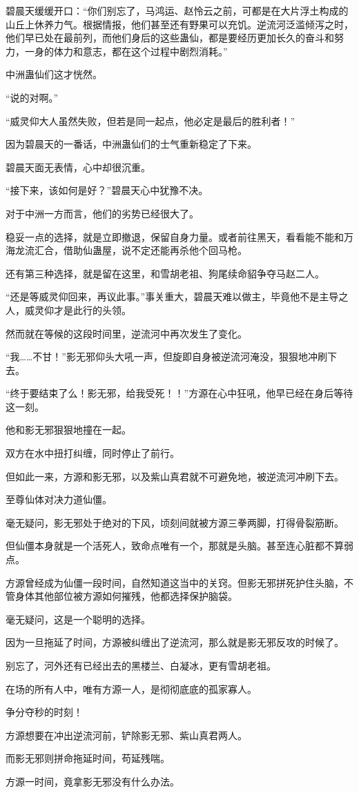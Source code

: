 \begin{this_body}
碧晨天缓缓开口：“你们别忘了，马鸿运、赵怜云之前，可都是在大片浮土构成的山丘上休养力气。根据情报，他们甚至还有野果可以充饥。逆流河泛滥倾泻之时，他们早已处在最前列，而他们身后的这些蛊仙，都是要经历更加长久的奋斗和努力，一身的体力和意志，都在这个过程中剧烈消耗。”

中洲蛊仙们这才恍然。

“说的对啊。”

“威灵仰大人虽然失败，但若是同一起点，他必定是最后的胜利者！”

因为碧晨天的一番话，中洲蛊仙们的士气重新稳定了下来。

碧晨天面无表情，心中却很沉重。

“接下来，该如何是好？”碧晨天心中犹豫不决。

对于中洲一方而言，他们的劣势已经很大了。

稳妥一点的选择，就是立即撤退，保留自身力量。或者前往黑天，看看能不能和万海龙流汇合，借助仙蛊屋，说不定还能再杀他个回马枪。

还有第三种选择，就是留在这里，和雪胡老祖、狗尾续命貂争夺马赵二人。

“还是等威灵仰回来，再议此事。”事关重大，碧晨天难以做主，毕竟他不是主导之人，威灵仰才是此行的头领。

然而就在等候的这段时间里，逆流河中再次发生了变化。

“我……不甘！”影无邪仰头大吼一声，但旋即自身被逆流河淹没，狠狠地冲刷下去。

“终于要结束了么！影无邪，给我受死！！”方源在心中狂吼，他早已经在身后等待这一刻。

他和影无邪狠狠地撞在一起。

双方在水中扭打纠缠，同时停止了前行。

但如此一来，方源和影无邪，以及紫山真君就不可避免地，被逆流河冲刷下去。

至尊仙体对决力道仙僵。

毫无疑问，影无邪处于绝对的下风，顷刻间就被方源三拳两脚，打得骨裂筋断。

但仙僵本身就是一个活死人，致命点唯有一个，那就是头脑。甚至连心脏都不算弱点。

方源曾经成为仙僵一段时间，自然知道这当中的关窍。但影无邪拼死护住头脑，不管身体其他部位被方源如何摧残，他都选择保护脑袋。

毫无疑问，这是一个聪明的选择。

因为一旦拖延了时间，方源被纠缠出了逆流河，那么就是影无邪反攻的时候了。

别忘了，河外还有已经出去的黑楼兰、白凝冰，更有雪胡老祖。

在场的所有人中，唯有方源一人，是彻彻底底的孤家寡人。

争分夺秒的时刻！

方源想要在冲出逆流河前，铲除影无邪、紫山真君两人。

而影无邪则拼命拖延时间，苟延残喘。

方源一时间，竟拿影无邪没有什么办法。

\end{this_body}


